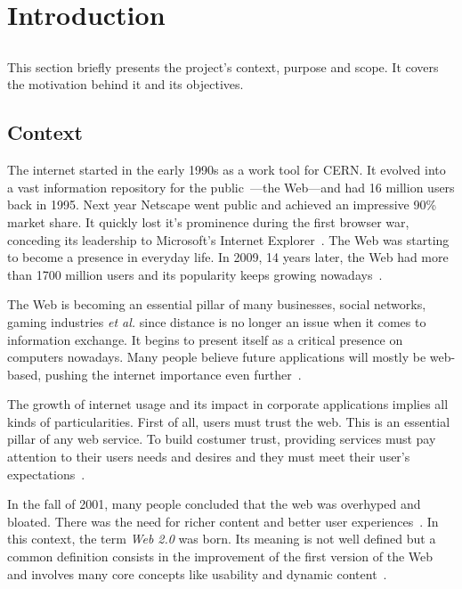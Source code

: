 \chapter{Introduction} %
\label{cha:introduction}

\section*{} %
This section briefly presents the project's context, purpose and scope. It covers the motivation behind it and its objectives.%


\section{Context} %
\label{sec:context}
The internet started in the early 1990s as a work tool for CERN. It evolved into a vast information repository for the public~\cite{teaching_webdev_web20}---the Web---and had 16 million users back in 1995. Next year Netscape went public and achieved an impressive 90\% market share. It quickly lost it's prominence during the first browser war, conceding its leadership to Microsoft's Internet Explorer~\cite{browser_wars}. The Web was starting to become a presence in everyday life. In 2009, 14 years later, the Web had more than 1700 million users and its popularity keeps growing nowadays~\cite{internet_stats}.

The Web is becoming an essential pillar of many businesses, social networks, gaming industries \textit{et al.} since distance is no longer an issue when it comes to information exchange.  It begins to present itself as a critical presence on computers nowadays. Many people believe future applications will mostly be web-based, pushing the internet importance even further~\cite{browser_application_platform}.

The growth of internet usage and its impact in corporate applications implies all kinds of particularities. First of all, users must trust the web. This is an essential pillar of any web service. To build costumer trust, providing services must pay attention to their users needs and desires and they must meet their user's expectations~\cite{trust_semantic_web}. 

In the fall of 2001, many people concluded that the web was overhyped and bloated. There was the need for richer content and better user experiences~\cite{oreilly_web20}. In this context, the term \textit{Web 2.0} was born. Its meaning is not well defined but a common definition consists in the improvement of the first version of the Web~\cite{rubyonrails_tutorial} and involves many core concepts like usability and dynamic content~\cite{what_is_web20}.

